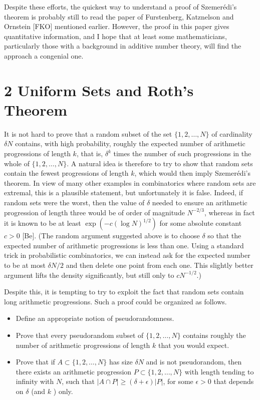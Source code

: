 \documentclass[10pt]{article}
\begin{document}
Despite these efforts, the quickest way to understand a proof of Szemerédi's theorem is probably still to read the paper of Furstenberg, Katznelson and Ornstein [FKO] mentioned earlier. However, the proof in this paper gives quantitative information, and I hope that at least some mathematicians, particularly those with a background in additive number theory, will find the approach a congenial one.

\section*{2 Uniform Sets and Roth's Theorem}
It is not hard to prove that a random subset of the set $\{1,2, \ldots, N\}$ of cardinality $\delta N$ contains, with high probability, roughly the expected number of arithmetic progressions of length $k$, that is, $\delta^{k}$ times the number of such progressions in the whole of $\{1,2, \ldots, N\}$. A natural idea is therefore to try to show that random sets contain the fewest progressions of length $k$, which would then imply Szemerédi's theorem. In view of many other examples in combinatorics where random sets are extremal, this is a plausible statement, but unfortunately it is false. Indeed, if random sets were the worst, then the value of $\delta$ needed to ensure an arithmetic progression of length three would be of order of magnitude $N^{-2 / 3}$, whereas in fact it is known to be at least $\exp \left(-c(\log N)^{1 / 2}\right)$ for some absolute constant $c>0$ [Be]. (The random argument suggested above is to choose $\delta$ so that the expected number of arithmetic progressions is less than one. Using a standard trick in probabilistic combinatorics, we can instead ask for the expected number to be at most $\delta N / 2$ and then delete one point from each one. This slightly better argument lifts the density significantly, but still only to $c N^{-1 / 2}$.)

Despite this, it is tempting to try to exploit the fact that random sets contain long arithmetic progressions. Such a proof could be organized as follows.

\begin{itemize}
  \item[(1)] Define an appropriate notion of pseudorandomness.
  \item[(2)] Prove that every pseudorandom subset of $\{1,2, \ldots, N\}$ contains roughly the number of arithmetic progressions of length $k$ that you would expect.
  \item[(3)] Prove that if $A \subset\{1,2, \ldots, N\}$ has size $\delta N$ and is not pseudorandom, then there exists an arithmetic progression $P \subset\{1,2, \ldots, N\}$ with length tending to infinity with $N$, such that $|A \cap P| \geqslant(\delta+\epsilon)|P|$, for some $\epsilon>0$ that depends on $\delta$ (and $k$ ) only.
\end{itemize}
\end{document}
